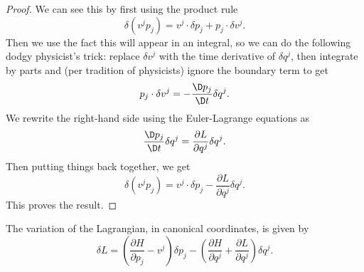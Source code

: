 \begin{proof}
  We can see this by first using the product rule
    \begin{equation}
\delta(v^{j}p_{j}) = v^{j}\cdot\delta p_{j} + p_{j}\cdot\delta v^{j}.
  \end{equation}
Then we use the fact this will appear in an integral, so we can do the
following dodgy physicist's trick: replace $\delta v^{j}$ with the time
derivative of $\delta q^{j}$, then
integrate by parts and (per tradition of physicists) ignore the boundary
term to get
\begin{equation}
p_{j}\cdot\delta v^{j} = -\frac{\D p_{j}}{\D t}\delta q^{j}.
\end{equation}
We rewrite the right-hand side using the Euler-Lagrange equations as
\begin{equation}
\frac{\D p_{j}}{\D t}\delta q^{j} = \frac{\partial L}{\partial q^{j}}\delta q^{j}.
\end{equation}
Then putting things back together, we get
\begin{equation}
\delta(v^{j}p_{j}) = v^{j}\cdot\delta p_{j} - \frac{\partial L}{\partial q^{j}}\delta q^{j}.
\end{equation}
This proves the result.
\end{proof}


\begin{theorem}
  The variation of the Lagrangian, in canonical coordinates, is given by
  \begin{equation}
\delta L = \left(\frac{\partial H}{\partial p_{j}}-v^{j}\right)\delta p_{j} -
\left(\frac{\partial H}{\partial q^{j}} + \frac{\partial L}{\partial q^{j}}\right)\delta q^{j}.
  \end{equation}
\end{theorem}

